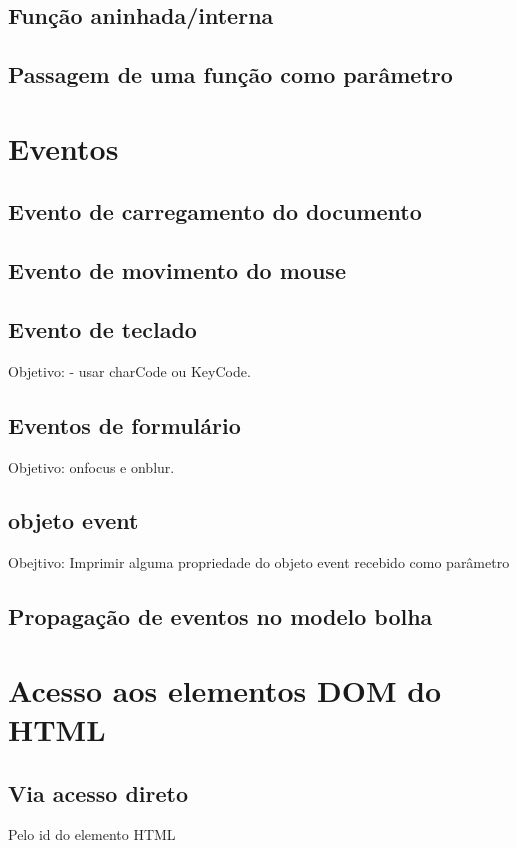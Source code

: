\subsection{Função aninhada/interna}
\subsection{Passagem de uma função como parâmetro}

\section{Eventos}
\subsection{Evento de carregamento do documento}


\subsection{Evento de movimento do mouse}


\subsection{Evento de teclado}
 Objetivo:  - usar charCode ou KeyCode.
 
 
\subsection{Eventos de formulário}
Objetivo: onfocus e onblur.


\subsection{objeto event}
Obejtivo: Imprimir alguma propriedade do objeto event recebido como parâmetro

\subsection{Propagação de eventos no modelo bolha}

\section{Acesso aos elementos DOM do HTML }
\subsection{Via acesso direto}
 Pelo id do elemento HTML
